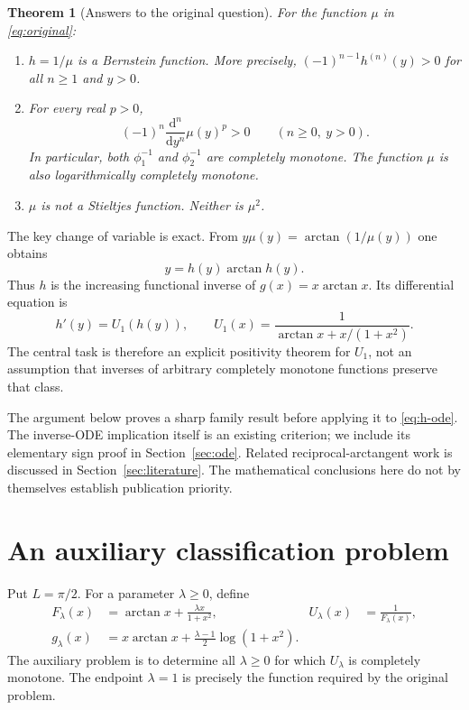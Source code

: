 \documentclass[11pt,a4paper]{article}
\newtheorem{theorem}{Theorem}[section]
\theoremstyle{definition}\newtheorem{definition}[theorem]{Definition}
\theoremstyle{remark}\newtheorem{remark}[theorem]{Remark}
\begin{document}
\begin{theorem}[Answers to the original question]\label{thm:main}
For the function $\mu$ in \eqref{eq:original}:
\begin{enumerate}[label=\textup{(\roman*)}]
\item $h=1/\mu$ is a Bernstein function. More precisely,
$(-1)^{n-1}h^{(n)}(y)>0$ for all $n\ge1$ and $y>0$.
\item For every real $p>0$,
\[
 (-1)^n\frac{\mathrm d^n}{\mathrm dy^n}\mu(y)^p>0
 \qquad(n\ge0,\ y>0).
\]
In particular, both $\phi_1^{-1}$ and $\phi_2^{-1}$ are completely
monotone. The function $\mu$ is also logarithmically completely
monotone.
\item $\mu$ is not a Stieltjes function. Neither is $\mu^2$.
\end{enumerate}
\end{theorem}

The key change of variable is exact. From
$y\mu(y)=\arctan(1/\mu(y))$ one obtains
\begin{equation}\label{eq:h-inverse}
 y=h(y)\arctan h(y).
\end{equation}
Thus $h$ is the increasing functional inverse of $g(x)=x\arctan x$.
Its differential equation is
\begin{equation}\label{eq:h-ode}
 h'(y)=U_1(h(y)),\qquad
 U_1(x)=\frac1{\arctan x+x/(1+x^2)}.
\end{equation}
The central task is therefore an explicit positivity theorem for
$U_1$, not an assumption that inverses of arbitrary completely
monotone functions preserve that class.

The argument below proves a sharp family result before applying it
to \eqref{eq:h-ode}. The inverse-ODE implication itself is an existing
criterion; we include its elementary sign proof in Section~\ref{sec:ode}.
Related reciprocal-arctangent work is discussed in
Section~\ref{sec:literature}. The mathematical conclusions here do
not by themselves establish publication priority.

\section{An auxiliary classification problem}

Put $L=\pi/2$. For a parameter $\lambda\ge0$, define
\begin{align}
 F_\lambda(x)&=\arctan x+\frac{\lambda x}{1+x^2},
 &U_\lambda(x)&=\frac1{F_\lambda(x)},\label{eq:F-U}\\
 g_\lambda(x)&=x\arctan x+
           \frac{\lambda-1}{2}\log(1+x^2).
 &&\label{eq:g-lambda}
\end{align}
The auxiliary problem is to determine all $\lambda\ge0$ for which
$U_\lambda$ is completely monotone. The endpoint $\lambda=1$ is
precisely the function required by the original problem.
\end{document}
